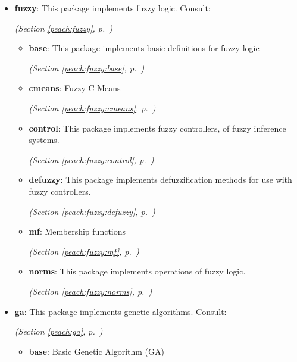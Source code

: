 \begin{itemize}
\setlength{\parskip}{0ex}
\item \textbf{fuzzy}: 
This package implements fuzzy logic. Consult:


  \textit{(Section \ref{peach:fuzzy}, p.~\pageref{peach:fuzzy})}

  \begin{itemize}
\setlength{\parskip}{0ex}
    \item \textbf{base}: 
This package implements basic definitions for fuzzy logic


  \textit{(Section \ref{peach:fuzzy:base}, p.~\pageref{peach:fuzzy:base})}

    \item \textbf{cmeans}: 
Fuzzy C-Means


  \textit{(Section \ref{peach:fuzzy:cmeans}, p.~\pageref{peach:fuzzy:cmeans})}

    \item \textbf{control}: 
This package implements fuzzy controllers, of fuzzy inference systems.


  \textit{(Section \ref{peach:fuzzy:control}, p.~\pageref{peach:fuzzy:control})}

    \item \textbf{defuzzy}: 
This package implements defuzzification methods for use with fuzzy controllers.


  \textit{(Section \ref{peach:fuzzy:defuzzy}, p.~\pageref{peach:fuzzy:defuzzy})}

    \item \textbf{mf}: 
Membership functions


  \textit{(Section \ref{peach:fuzzy:mf}, p.~\pageref{peach:fuzzy:mf})}

    \item \textbf{norms}: 
This package implements operations of fuzzy logic.


  \textit{(Section \ref{peach:fuzzy:norms}, p.~\pageref{peach:fuzzy:norms})}

  \end{itemize}
\item \textbf{ga}: 
This package implements genetic algorithms. Consult:


  \textit{(Section \ref{peach:ga}, p.~\pageref{peach:ga})}

  \begin{itemize}
\setlength{\parskip}{0ex}
    \item \textbf{base}: 
Basic Genetic Algorithm (GA)



\end{itemize}
\end{itemize}
